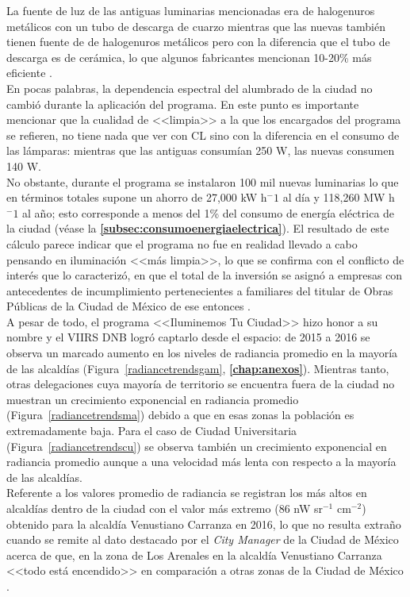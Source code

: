 La fuente de luz de las antiguas luminarias mencionadas era de halogenuros metálicos con un tubo de descarga de cuarzo mientras que las nuevas también tienen fuente de de halogenuros metálicos pero con la diferencia que el tubo de descarga es de cerámica, lo que algunos fabricantes mencionan 10-20\% más eficiente \citep{EMB2007}.\\

En pocas palabras, la dependencia espectral del alumbrado de la ciudad no cambió durante la aplicación del programa. En este punto es importante mencionar que la cualidad de <<limpia>> a la que los encargados del programa se refieren, no tiene nada que ver con CL sino con la diferencia en el consumo de las lámparas: mientras que las antiguas consumían 250 W, las nuevas consumen 140 W.\\ 

No obstante, durante el programa se instalaron 100 mil nuevas luminarias lo que en términos totales supone un ahorro de 27,000 kW h$^-1$ al día y 118,260 MW h$^-1$ al año; esto corresponde a menos del 1\% del consumo de energía eléctrica de la ciudad (véase la \textbf{\autoref{subsec:consumoenergiaelectrica}}). El resultado de este cálculo parece indicar que el programa no fue en realidad llevado a cabo pensando en iluminación <<más limpia>>, lo que se confirma con el conflicto de interés que lo caracterizó, en que el total de la inversión se asignó a empresas con antecedentes de incumplimiento pertenecientes a familiares del titular de Obras Públicas de la Ciudad de México de ese entonces \citep{Sinembargo2015}.\\ 

A pesar de todo, el programa <<Iluminemos Tu Ciudad>> hizo honor a su nombre y el VIIRS DNB logró captarlo desde el espacio: de 2015 a 2016 se observa un marcado aumento en los niveles de radiancia promedio en la mayoría de las alcaldías (Figura~\ref{radiancetrendsgam}, \textbf{\autoref{chap:anexos}}). Mientras tanto, otras delegaciones cuya mayoría de territorio se encuentra fuera de la ciudad no muestran un crecimiento exponencial en radiancia promedio (Figura~\ref{radiancetrendsma}) debido a que en esas zonas la población es extremadamente baja. Para el caso de Ciudad Universitaria (Figura~\ref{radiancetrendscu}) se observa también un crecimiento exponencial en radiancia promedio aunque a una velocidad más lenta con respecto a la mayoría de las alcaldías.\\ 


Referente a los valores promedio de radiancia se registran los más altos en alcaldías dentro de la ciudad con el valor más extremo (86 nW sr$^{-1}$  cm$^{-2}$) obtenido para la alcaldía Venustiano Carranza en 2016, lo que no resulta extraño cuando se remite al dato destacado por el \textit{City Manager} de la Ciudad de México acerca de que, en la zona de Los Arenales en la alcaldía Venustiano Carranza <<todo está encendido>> en comparación a otras zonas de la Ciudad de México \citep{Universal2017}.\\

